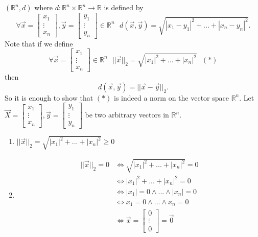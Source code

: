 \begin{example}
    $(\mathbb{R}^n, d)$ where $d:\mathbb{R}^n \times \mathbb{R}^n \rightarrow \mathbb{R}$ is defined by
    $$\forall \overrightarrow{x} = \begin{bmatrix}x_1 \\ \vdots \\ x_n \end{bmatrix},
    \overrightarrow{y} = \begin{bmatrix}y_1 \\ \vdots \\ y_n \end{bmatrix} \in \mathbb{R}^n ~~~ d(\overrightarrow{x}, \overrightarrow{y}) = \sqrt{|x_1-y_1|^2 + ... + |x_n - y_n|^2}.$$
    Note that if we define
    $$\forall \overrightarrow{x}=\begin{bmatrix}x_1 \\ \vdots \\ x_n\end{bmatrix} \in \mathbb{R}^n ~~~ ||\overrightarrow{x}||_2 = \sqrt{|x_1|^2+...+|x_n|^2} ~~~(*)$$
    then
    $$d(\overrightarrow{x}, \overrightarrow{y}) = ||\overrightarrow{x} - \overrightarrow{y}||_2.$$
    So it is enough to show that $(*)$ is indeed a norm on the vector space $\mathbb{R}^n$.
    Let $\overrightarrow{X} = \begin{bmatrix} x_1 \\ \vdots \\ x_n \end{bmatrix}, \overrightarrow{y}=\begin{bmatrix} y_1 \\ \vdots \\ y_n \end{bmatrix}$ be two arbitrary vectors in $\mathbb{R}^n$.
    \begin{enumerate}[$(i)$]
        \item $||\overrightarrow{x}||_2 = \sqrt{|x_1|^2+...+|x_n|^2} \geq 0$
        \item \begin{align*}||\overrightarrow{x}||_2 = 0 &\iff \sqrt{|x_1|^2+...+|x_n|^2} = 0 \\ &\iff |x_1|^2+...+|x_n|^2=0 \\ &\iff |x_1|=0 \wedge ... \wedge |x_n|=0 \\ &\iff x_1 =0 \wedge ... \wedge x_n=0 \\ &\iff \overrightarrow{x} = \begin{bmatrix} 0 \\ \vdots \\ 0 \end{bmatrix} = \overrightarrow{0} \end{align*}

\end{enumerate}
\end{example}
